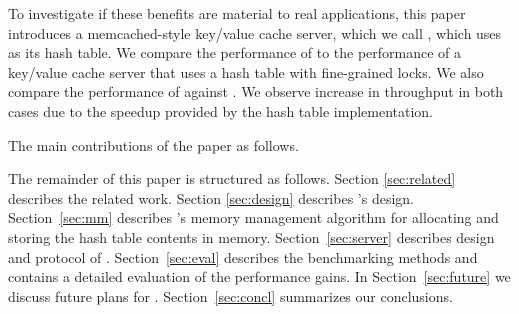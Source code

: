 To investigate if these benefits are material to real applications, this paper introduces a memcached-style key/value cache server, which we call \cpserver{}, which uses \cphash{} as its hash table.  We compare the performance of \cpserver{} to the performance of a key/value cache server that uses a hash table with fine-grained locks. We also compare the performance of \cpserver{} against \memcached{}.  We observe increase in throughput in both cases due to the speedup provided by the \cphash{} hash table implementation.  

The main contributions of the paper as follows. 

The remainder of this paper is structured as follows. Section \ref{sec:related} describes the related work. Section \ref{sec:design} describes \cphash{}'s design. Section~\ref{sec:mm} describes \cphash{}'s memory management algorithm for allocating and storing the hash table contents in memory. Section~\ref{sec:server} describes design and protocol of \cpserver{}.  Section~\ref{sec:eval} describes the benchmarking methods and contains a detailed evaluation of the performance gains. In Section~\ref{sec:future} we discuss future plans for \cphash{}.  Section~\ref{sec:concl} summarizes our conclusions.

